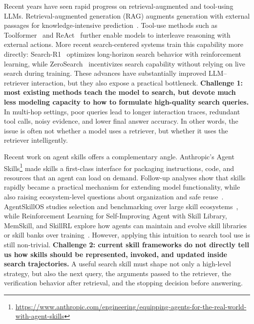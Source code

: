 \documentclass{article}
\begin{document}
Recent years have seen rapid progress on retrieval-augmented and tool-using LLMs. Retrieval-augmented generation (RAG) augments generation with external passages for knowledge-intensive prediction~\citep{lewis2021rag}. Tool-use methods such as Toolformer~\citep{schick2023toolformer} and ReAct~\citep{yao2023react} further enable models to interleave reasoning with external actions. More recent search-centered systems train this capability more directly: Search-R1~\citep{jin2025searchr1} optimizes long-horizon search behavior with reinforcement learning, while ZeroSearch~\citep{sun2025zerosearch} incentivizes search capability without relying on live search during training. These advances have substantially improved LLM--retriever interaction, but they also expose a practical bottleneck. \textbf{Challenge 1: most existing methods teach the model to search, but devote much less modeling capacity to how to formulate high-quality search queries.} In multi-hop settings, poor queries lead to longer interaction traces, redundant tool calls, noisy evidence, and lower final answer accuracy. In other words, the issue is often not whether a model uses a retriever, but whether it uses the retriever intelligently.

Recent work on agent skills offers a complementary angle. Anthropic's Agent Skills\footnote{\url{https://www.anthropic.com/engineering/equipping-agents-for-the-real-world-with-agent-skills}} made skills a first-class interface for packaging instructions, code, and resources that an agent can load on demand. Follow-up analyses show that skills rapidly became a practical mechanism for extending model functionality, while also raising ecosystem-level questions about organization and safe reuse~\citep{ling2026agentskillsdatadrivenanalysis,liu2026agentskillswildempirical}. AgentSkillOS studies selection and benchmarking over large skill ecosystems~\citep{li2026agentskillos}, while Reinforcement Learning for Self-Improving Agent with Skill Library, MemSkill, and SkillRL explore how agents can maintain and evolve skill libraries or skill banks over training~\citep{wang2026skilllibraryrl,zhang2026memskill,xia2026skillrl}. However, applying this intuition to search tool use is still non-trivial. \textbf{Challenge 2: current skill frameworks do not directly tell us how skills should be represented, invoked, and updated inside search trajectories.} A useful search skill must shape not only a high-level strategy, but also the next query, the arguments passed to the retriever, the verification behavior after retrieval, and the stopping decision before answering.
\end{document}
